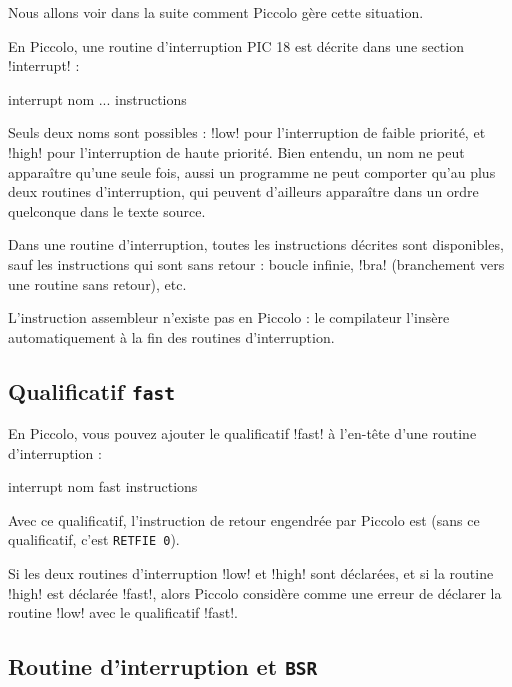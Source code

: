 Nous allons voir dans la suite comment Piccolo gère cette situation.

En Piccolo, une routine d’interruption PIC 18 est décrite dans une section \pic!interrupt! :

\begin{piccolo}
interrupt nom ... {
 instructions
}
\end{piccolo}

Seuls deux noms sont possibles : \pic!low! pour l’interruption de faible priorité, et \pic!high! pour l’interruption de haute priorité. Bien entendu, un nom ne peut apparaître qu’une seule fois, aussi un programme ne peut comporter qu'au plus deux routines d'interruption, qui peuvent d'ailleurs apparaître dans un ordre quelconque dans le texte source.

Dans une routine d'interruption, toutes les instructions décrites sont disponibles, sauf les instructions qui sont sans retour : boucle infinie, \pic!bra! (branchement vers une routine sans retour), etc.

L’instruction assembleur  n’existe pas en Piccolo : le compilateur l’insère automatiquement à la fin des routines d’interruption.



\subsection{Qualificatif \texttt{fast}}

En Piccolo, vous pouvez ajouter le qualificatif \pic!fast! à l’en-tête d’une routine d’interruption :

\begin{piccolo}
interrupt nom fast {
 instructions
}
\end{piccolo}

Avec ce qualificatif, l’instruction de retour engendrée par Piccolo est  (sans ce qualificatif, c’est \texttt{RETFIE 0}).

Si les deux routines d’interruption \pic!low! et \pic!high! sont déclarées, et si la routine \pic!high! est déclarée \pic!fast!, alors Piccolo considère comme une erreur de déclarer la routine \pic!low! avec le qualificatif \pic!fast!.






\subsection{Routine d'interruption et \texttt{BSR}}

